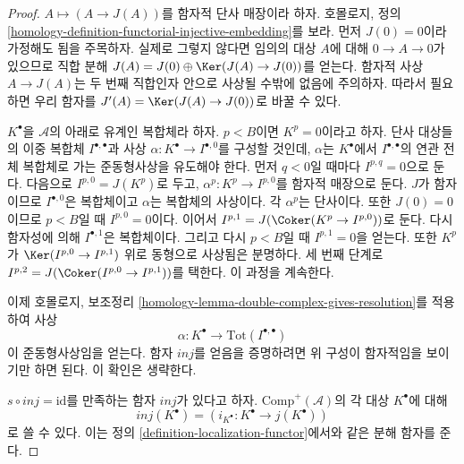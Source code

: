 \begin{proof}
$A \mapsto (A \to J(A))$를 함자적 단사 매장이라 하자. 호몰로지, 정의
\ref{homology-definition-functorial-injective-embedding}를 보라.
먼저 $J(0) = 0$이라 가정해도 됨을 주목하자. 실제로 그렇지 않다면
임의의 대상 $A$에 대해 $0 \to A \to 0$가 있으므로 직합 분해
$J(A) = J(0) \oplus \Ker(J(A) \to J(0))$를 얻는다.
함자적 사상 $A \to J(A)$는 두 번째 직합인자 안으로 사상될 수밖에
없음에 주의하자. 따라서 필요하면 우리 함자를
$J'(A) = \Ker(J(A) \to J(0))$로 바꿀 수 있다.

\medskip\noindent
$K^\bullet$을 $\mathcal{A}$의 아래로 유계인 복합체라 하자.
$p < B$이면 $K^p = 0$이라고 하자. 단사 대상들의 이중 복합체
$I^{\bullet, \bullet}$과 사상 $\alpha : K^\bullet \to I^{\bullet, 0}$를
구성할 것인데, $\alpha$는 $K^\bullet$에서
$I^{\bullet, \bullet}$의 연관 전체 복합체로 가는 준동형사상을
유도해야 한다. 먼저 $q < 0$일 때마다 $I^{p, q} = 0$으로 둔다.
다음으로 $I^{p, 0} = J(K^p)$로 두고, $\alpha^p : K^p \to I^{p, 0}$를
함자적 매장으로 둔다. $J$가 함자이므로 $I^{\bullet, 0}$은 복합체이고
$\alpha$는 복합체의 사상이다. 각 $\alpha^p$는 단사이다. 또한
$J(0) = 0$이므로 $p < B$일 때 $I^{p, 0} = 0$이다. 이어서
$I^{p, 1} = J(\Coker(K^p \to I^{p, 0}))$로 둔다. 다시 함자성에 의해
$I^{\bullet, 1}$은 복합체이다. 그리고 다시 $p < B$일 때
$I^{p, 1} = 0$을 얻는다. 또한 $K^p$가
$\Ker(I^{p, 0} \to I^{p, 1})$ 위로 동형으로 사상됨은 분명하다.
세 번째 단계로 $I^{p, 2} = J(\Coker(I^{p, 0} \to I^{p, 1}))$를
택한다. 이 과정을 계속한다.

\medskip\noindent
이제 호몰로지, 보조정리
\ref{homology-lemma-double-complex-gives-resolution}를 적용하여 사상
$$
\alpha : K^\bullet \longrightarrow \text{Tot}(I^{\bullet, \bullet})
$$
이 준동형사상임을 얻는다.
함자 $inj$를 얻음을 증명하려면 위 구성이 함자적임을 보이기만 하면
된다. 이 확인은 생략한다.

\medskip\noindent
$s \circ inj = \text{id}$를 만족하는 함자 $inj$가 있다고 하자.
$\text{Comp}^{+}(\mathcal{A})$의 각 대상 $K^\bullet$에 대해
$$
inj(K^\bullet) = (i_{K^\bullet} : K^\bullet \to j(K^\bullet))
$$
로 쓸 수 있다. 이는 정의 \ref{definition-localization-functor}에서와 같은
분해 함자를 준다.
\end{proof}

